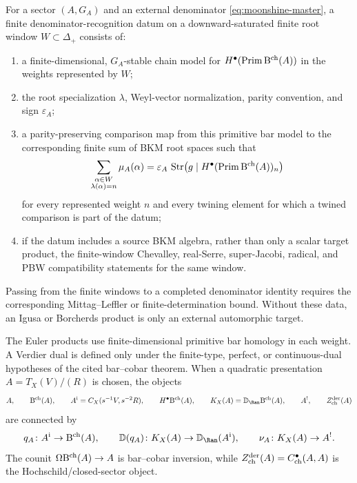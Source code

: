 \begin{definition}
\label{def:moonshine-finite-denominator-recognition}
For a sector $(A,G_A)$ and an external denominator
\eqref{eq:moonshine-master}, a finite denominator-recognition datum on
a downward-saturated finite root window $W\subset\Delta_+$ consists of:
\begin{enumerate}[label=\textup{(\roman*)}]
\item a finite-dimensional, $G_A$-stable chain model for
$H^\bullet(\operatorname{Prim}\mathrm B^{\mathrm{ch}}(A))$ in the weights represented by
$W$;
\item the root specialization $\lambda$, Weyl-vector normalization,
parity convention, and sign $\varepsilon_A$;
\item a parity-preserving comparison map from this primitive bar model
to the corresponding finite sum of BKM root spaces such that
\[
 \sum_{\substack{\alpha\in W\\ \lambda(\alpha)=n}}\mu_A(\alpha)
 =
 \varepsilon_A\,
 \operatorname{Str}\!\left(g\mid H^\bullet(\operatorname{Prim}\mathrm B^{\mathrm{ch}}(A))_n\right)
\]
for every represented weight $n$ and every twining element for which a
twined comparison is part of the datum;
\item if the datum includes a source BKM algebra, rather than only a
scalar target product, the finite-window Chevalley, real-Serre, super-Jacobi,
radical, and PBW compatibility statements for the same window.
\end{enumerate}
Passing from the finite windows to a completed denominator identity
requires the corresponding Mittag--Leffler or finite-determination
bound.  Without these data, an Igusa or Borcherds product is only an
external automorphic target.
\end{definition}

\begin{remark}
\label{rem:moonshine-finite-type-verdier-firewall}
The Euler products use finite-dimensional primitive bar homology in
each weight.  A Verdier dual is defined only under the
finite-type, perfect, or continuous-dual hypotheses of the cited
bar--cobar theorem.  When a quadratic presentation
$A=T_X(V)/(R)$ is chosen, the objects
\[
 A,\qquad
 \Barch(A),\qquad
 A^{\mathrm i}=C_X(s^{-1}V,s^{-2}R),\qquad
 H^\bullet\Barch(A),\qquad
 K_X(A)=\mathbb D_{\Ran}\Barch(A),\qquad
 A^!,\qquad
 \ZcSig(A)
\]
are connected by
\[
q_A\colon A^{\mathrm i}\to\Barch(A),\qquad
\mathbb D(q_A)\colon K_X(A)\to\mathbb D_{\Ran}(A^{\mathrm i}),
\qquad
\nu_A\colon K_X(A)\to A^!.
\]
The counit $\Omega\mathrm B^{\mathrm{ch}}(A)\to A$ is bar--cobar inversion, while
$Z^{\mathrm{der}}_{\mathrm{ch}}(A)=C^\bullet_{\mathrm{ch}}(A,A)$ is the Hochschild/closed-sector
object.
\end{remark}

